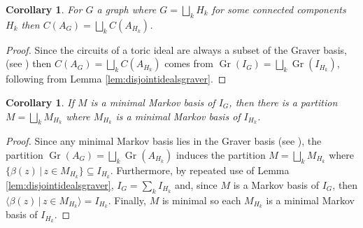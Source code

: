 \documentclass[a4paper, 12pt]{article}
\newcommand{\ZZ}{\mathbb Z}
\theoremstyle{plain}
\newtheorem{lemma}[theorem]{Lemma}
\newtheorem{corollary}[theorem]{Corollary}
\theoremstyle{definition}
\theoremstyle{remark}
\begin{document}
\begin{corollary} \label{cor:disjointcircuits}
    For $G$ a graph where $G=\bigsqcup_k H_k$ for some connected components $H_k$ then $C(A_G)=\bigsqcup_k C(A_{H_k})$.
\end{corollary}

\begin{proof}
    Since the circuits of a toric ideal are always a subset of the Graver basis, (see \cite{sturmfels1996grobner}) then $C(A_G)=\bigsqcup_k C(A_{H_k})$ comes from $\operatorname{Gr}(I_G)=\bigsqcup_k \operatorname{Gr}(I_{H_k})$, following from Lemma \ref{lem:disjointidealsgraver}.
\end{proof}

\begin{corollary}
\label{cor:disjointmarkov}
    If $M$ is a minimal Markov basis of $I_G$, then there is a partition $M= \bigsqcup_k M_{H_k}$ where $M_{H_k}$ is a minimal Markov basis of $I_{H_k}$.
\end{corollary}

\begin{proof}
    Since any minimal Markov basis lies in the Graver basis (see \cite{sturmfels1996grobner}), the partition $\operatorname{Gr}(A_G)=\bigsqcup_k \operatorname{Gr}(A_{H_k})$ induces the partition $M= \bigsqcup_k M_{H_k}$ where $\{\beta(z) \,|\, z \in M_{H_k}\} \subseteq I_{H_k}$. Furthermore, by repeated use of Lemma \ref{lem:disjointidealsgraver}, $I_G=\sum_k I_{H_k}$ and, since $M$ is a Markov basis of $I_G$, then $\langle \beta(z) \,|\, z \in M_{H_k} \rangle = I_{H_k}$. Finally, $M$ is minimal so each $M_{H_k}$ is a minimal Markov basis of $I_{H_k}$.
\end{proof}








\end{document}
